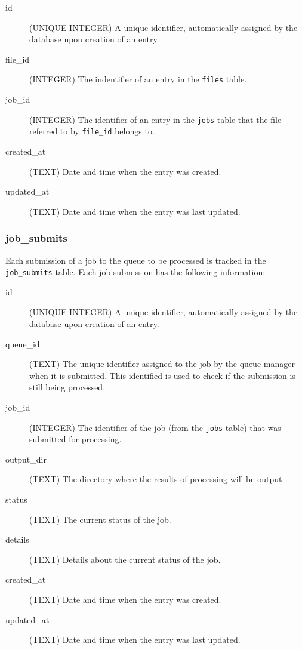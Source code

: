 \begin{description}
    \item[id] (UNIQUE INTEGER)  A unique identifier, automatically assigned by the database upon creation of an entry.
    \item[file\_id] (INTEGER) The indentifier of an entry in the \texttt{files} table.
    \item[job\_id] (INTEGER) The identifier of an entry in the \texttt{jobs} table that the file referred to by \texttt{file\_id} belongs to.
    \item[created\_at] (TEXT) Date and time when the entry was created.
    \item[updated\_at] (TEXT) Date and time when the entry was last updated.
\end{description}

\subsubsection{job\_submits}
Each submission of a job to the queue to be processed is tracked in the \texttt{job\_submits} table. Each job submission has the following information:

\begin{description}
    \item[id] (UNIQUE INTEGER)  A unique identifier, automatically assigned by the database upon creation of an entry.
    \item[queue\_id] (TEXT) The unique identifier assigned to the job by the queue manager when it is submitted. This identified is used to check if the submission is still being processed.
    \item[job\_id] (INTEGER) The identifier of the job (from the \texttt{jobs} table) that was submitted for processing.
    \item[output\_dir] (TEXT) The directory where the results of processing will be output.
    \item[status] (TEXT) The current status of the job.
    \item[details] (TEXT) Details about the current status of the job.
    \item[created\_at] (TEXT) Date and time when the entry was created.
    \item[updated\_at] (TEXT) Date and time when the entry was last updated.
\end{description}


